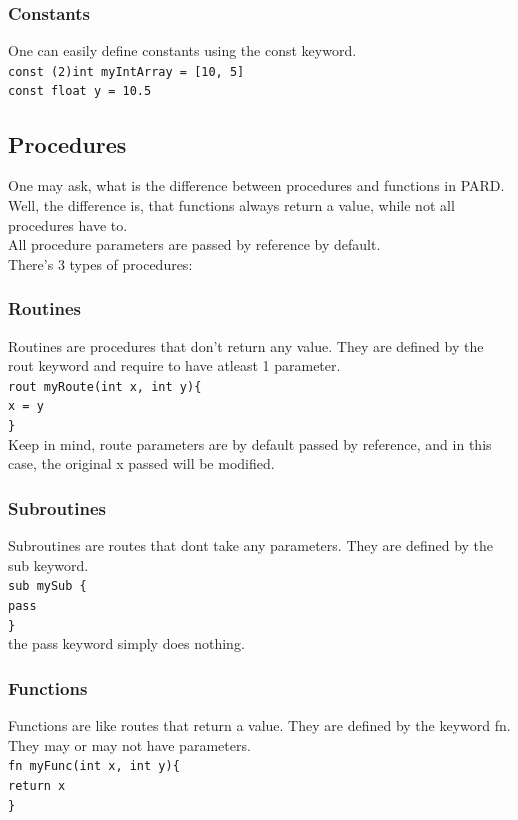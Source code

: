 \documentclass[11pt,a4paper]{article}
\begin{document}
\subsubsection{Constants}
One can easily define constants using the const keyword. \\
\texttt{const (2)int myIntArray = [10, 5]} \\
\texttt{const float y = 10.5} \\
\subsection{Procedures}
One may ask, what is the difference between procedures and functions in PARD. Well, the difference is, that functions always return a value, while not all procedures have to. \\
All procedure parameters are passed by reference by default. \\
There's 3 types of procedures:
\subsubsection{Routines}
Routines are procedures that don't return any value. They are defined by the rout keyword and require to have atleast 1 parameter. \\
\texttt{rout myRoute(int x, int y)\{  \\ x = y \\ \}  } \\
Keep in mind, route parameters are by default passed by reference, and in this case, the original x passed will be modified.
\subsubsection{Subroutines}
Subroutines are routes that dont take any parameters. They are defined by the sub keyword. \\ 
\texttt{sub mySub \{\\  pass \\\}} \\
the pass keyword simply does nothing.
\subsubsection{Functions}
Functions are like routes that return a value. They are defined by the keyword fn. They may or may not have parameters. \\
\texttt{fn myFunc(int x, int y)\{  \\ return x\\ \}  } \\
\end{document}
